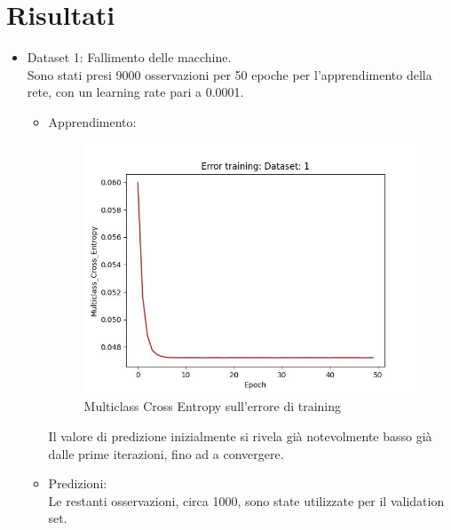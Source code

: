 \documentclass{article}
\begin{document}
    \section{Risultati}\label{sec:risultati}
        \begin{itemize}
            \item Dataset 1: Fallimento delle macchine. \\
            Sono stati presi 9000 osservazioni per 50 epoche per l'apprendimento della rete, con un learning rate pari a 0.0001.
            \begin{itemize}
                \item Apprendimento:
                \begin{figure}[H]
                    \centering
                    \includegraphics[scale=0.50]{loss1}
                    \caption{Multiclass Cross Entropy sull'errore di training}
                    \label{fig:figure2}
                \end{figure}
                Il valore di predizione inizialmente si rivela già notevolmente basso già dalle prime iterazioni, fino ad a convergere.\\
                \item Predizioni: \\
                Le restanti osservazioni, circa 1000, sono state utilizzate per il validation set.
                \begin{figure}[H]
                    \centering

\end{figure}
\end{itemize}
\end{itemize}
\end{document}
